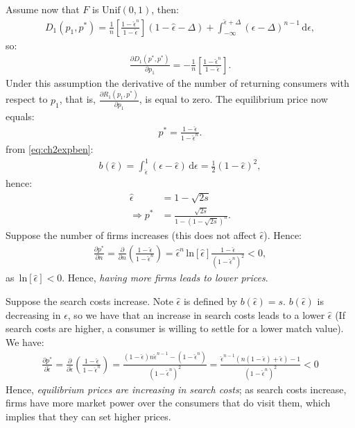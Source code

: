 \documentclass[12pt]{article}
\numberwithin{equation}{section}
\newcommand{\pder}[2]{\frac{\partial #1}{\partial #2}}
\newcommand{\ehat}{\hat\epsilon}
\newcommand{\Unif}[1]{\mathrm{Unif}(#1)}
\renewcommand{\d}[1]{\,\textrm{d}#1}
\newcommand{\1}[1]{\,\mathbbm{1}_{#1}} %
\renewcommand{\ln}[1]{\,\mathrm{ln}\left[#1\right]}
\begin{document}
Assume now that $F$ is $\Unif{0,1}$, then:
\begin{align}
	D_1(p_1,p^*)=\frac{1}{n}
	\left[\frac{1-\hat\epsilon^n}{1-\hat\epsilon}\right]
	(1-\hat\epsilon-\Delta)+
	\int_{-\infty}^{\hat\epsilon+\Delta}(\epsilon-\Delta)^{n-1}\d\epsilon,
\end{align}
so:
\begin{align}
	\frac{\partial D_1(p^*,p^*)}{\partial p_1}=-\frac{1}{n}
	\left[\frac{1-\hat\epsilon^n}{1-\hat\epsilon}\right].
\end{align}
Under this assumption the derivative of the number of returning
consumers with respect to $p_1$, that is,
$\frac{\partial R_1(p_1,p^*)}{\partial p_1}$, is equal to zero. The
equilibrium price now equals:
\begin{align}
	p^*=\frac{1-\hat\epsilon}{1-\hat\epsilon^n}.
\end{align}
from \ref{eq:ch2expben}:
\begin{align}
	b(\hat\epsilon)=\int_{\hat\epsilon}^1(\epsilon-\hat\epsilon)\d\epsilon
	=\frac{1}{2}(1-\hat\epsilon)^2,
\end{align}
hence:
\begin{align}
	\hat\epsilon        & =1-\sqrt{2s}                          \\
	\Longrightarrow p^* & =\frac{\sqrt{2s}}{1-(1-\sqrt{2s})^n}.
\end{align}
Suppose the number of firms increases (this does not affect
$\hat\epsilon$). Hence:
\begin{align}
	\frac{\partial p^*}{\partial n}=
	\frac{\partial}{\partial n}\left(\frac{1-\hat\epsilon}{1-\hat\epsilon^n}\right)
	=\hat\epsilon^n\ln{\hat\epsilon}\frac{1-\hat\epsilon}{(1-\hat\epsilon^n)^2}
	<0,
\end{align}
as $\ln{\hat\epsilon}<0$. Hence, \textit{having more firms leads to lower
	prices}.

Suppose the search costs increase. Note $\hat\epsilon$ is defined by
$b(\hat\epsilon)=s$. $b(\hat\epsilon)$ is decreasing in $\epsilon$, so
we have that an increase in search costs leads to a lower $\hat\epsilon$
(If search costs are higher, a consumer is willing to settle for a lower
match value). We have:
\begin{align}
	\pder{p^*}{\ehat}=\pder{}{\ehat}
	\left(\frac{1-\ehat}{1-\ehat^n}\right)
	=\frac{(1-\ehat)n\ehat^{n-1}-(1-\ehat^n)}{(1-\ehat^n)^2}
	=\frac{\ehat^{n-1}(n(1-\ehat)+\ehat)-1}{(1-\ehat^n)^2}
	<0
\end{align}
Hence, \textit{equilibrium prices are increasing in search costs}; as
search costs increase, firms have more market power over the consumers
that do visit them, which implies that they can set higher prices.
\end{document}

